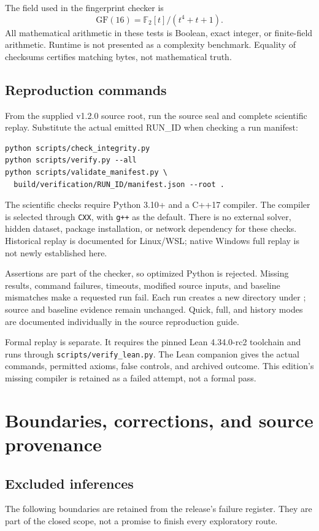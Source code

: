 \documentclass[11pt,letterpaper,oneside]{report}
\theoremstyle{komorebi}
\newcommand{\F}{\mathbb F_2}
\newcommand{\pathref}[1]{\texttt{\small\detokenize{#1}}}
\begin{document}
The field used in the fingerprint checker is
\[
 \mathrm{GF}(16)=\F[t]/(t^4+t+1).
\]
All mathematical arithmetic in these tests is Boolean, exact integer, or finite-field arithmetic. Runtime is not presented as a complexity benchmark. Equality of checksums certifies matching bytes, not mathematical truth.


\section{Reproduction commands}
From the supplied v1.2.0 source root, run the source seal and complete scientific replay. Substitute the actual emitted RUN\_ID when checking a run manifest:
\begin{verbatim}
python scripts/check_integrity.py
python scripts/verify.py --all
python scripts/validate_manifest.py \
  build/verification/RUN_ID/manifest.json --root .
\end{verbatim}
The scientific checks require Python 3.10+ and a C++17 compiler. The compiler is selected through \texttt{CXX}, with \texttt{g++} as the default. There is no external solver, hidden dataset, package installation, or network dependency for these checks. Historical replay is documented for Linux/WSL; native Windows full replay is not newly established here.

Assertions are part of the checker, so optimized Python is rejected. Missing results, command failures, timeouts, modified source inputs, and baseline mismatches make a requested run fail. Each run creates a new directory under \pathref{build/verification/}; source and baseline evidence remain unchanged. Quick, full, and history modes are documented individually in the source reproduction guide.

Formal replay is separate. It requires the pinned Lean 4.34.0-rc2 toolchain and runs through \texttt{scripts/verify\_lean.py}. The Lean companion gives the actual commands, permitted axioms, false controls, and archived outcome. This edition's missing compiler is retained as a failed attempt, not a formal pass.

\chapter{Boundaries, corrections, and source provenance}
\label{app:boundaries}
\section{Excluded inferences}
The following boundaries are retained from the release's failure register. They are part of the closed scope, not a promise to finish every exploratory route.
\end{document}

